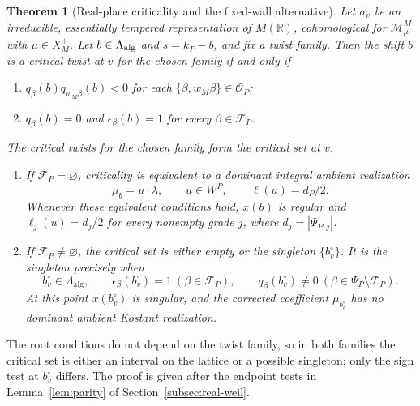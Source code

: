 \documentclass[12pt]{amsart}
\numberwithin{equation}{section}
\theoremstyle{plain}
\newtheorem{theorem}{Theorem}[section]
\theoremstyle{definition}
\theoremstyle{remark}
\newcommand{\R}{\mathbb R}
\newcommand{\cM}{\mathcal M}
\begin{document}
\begin{theorem}[Real-place criticality and the fixed-wall alternative] \label{thm:real-criterion}
Let $\sigma_v$ be an irreducible, essentially tempered representation of $M(\R)$, cohomological for $\cM_\mu^M$ with $\mu\in X_M^+$. Let $b\in\Lambda_{\rm alg}$ and $s=k_P-b$, and fix a twist family. Then the shift $b$ is a critical twist at $v$ for the chosen family if and only if 
\begin{enumerate}
\item $q_\beta(b)q_{w_M\beta}(b)<0$ for each $\{\beta,w_M\beta\}\in\mathcal O_P$;
\item $q_\beta(b)=0$ and $\epsilon_\beta(b)=1$ for every $\beta\in\mathcal F_P$.
\end{enumerate}
The critical twists for the chosen family form the \emph{critical set at $v$}.
\begin{enumerate}
\renewcommand{\labelenumi}{(\alph{enumi})}
\item If $\mathcal F_P=\varnothing$, criticality is equivalent to a dominant integral ambient realization
\[
 \mu_b=u\cdot\lambda,\qquad u\in W^P,\qquad
 \ell(u)=d_P/2.
\]
Whenever these equivalent conditions hold, $x(b)$ is regular and $\ell_j(u)=d_j/2$ for every nonempty grade $j$, where $d_j=|\Psi_{P,j}|$.
\item If $\mathcal F_P\ne\varnothing$, the critical set is either empty or the singleton $\{b_v^\circ\}$. It is the singleton precisely when 
\begin{equation}\label{eq:singleton}
 b_v^\circ\in\Lambda_{\mathrm{alg}},\qquad
 \epsilon_\beta(b_v^\circ)=1\ (\beta\in\mathcal F_P),\qquad
 q_\beta(b_v^\circ)\ne0\ (\beta\in\Psi_P\setminus\mathcal F_P).
\end{equation}
At this point $x(b_v^\circ)$ is singular, and the corrected coefficient $\mu_{b_v^\circ}$ has no dominant ambient Kostant realization.
\end{enumerate}
\end{theorem}

The root conditions do not depend on the twist family, so in both families the critical set is either an interval on the lattice or a possible singleton; only the sign test at $b_v^\circ$ differs. The proof is given after the endpoint tests in Lemma~\ref{lem:parity} of Section~\ref{subsec:real-weil}.
\end{document}
